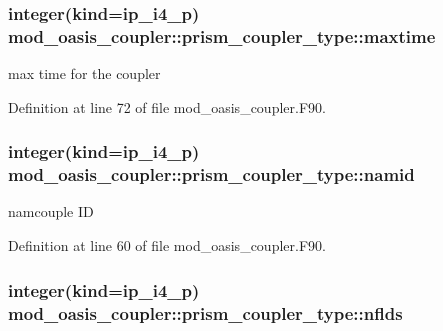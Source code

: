 \hypertarget{structmod__oasis__coupler_1_1prism__coupler__type_abe7dd91c4d011f5717e203191b7788e3}{
\subsubsection[{maxtime}]{\setlength{\rightskip}{0pt plus 5cm}integer(kind=ip\+\_\+i4\+\_\+p) mod\+\_\+oasis\+\_\+coupler\+::prism\+\_\+coupler\+\_\+type\+::maxtime\hspace{0.3cm}{\ttfamily [private]}}}\label{structmod__oasis__coupler_1_1prism__coupler__type_abe7dd91c4d011f5717e203191b7788e3}


max time for the coupler 



Definition at line 72 of file mod\+\_\+oasis\+\_\+coupler.\+F90.

\hypertarget{structmod__oasis__coupler_1_1prism__coupler__type_a68ccbd8305f8c1016a9025558ab8dea5}{
\subsubsection[{namid}]{\setlength{\rightskip}{0pt plus 5cm}integer(kind=ip\+\_\+i4\+\_\+p) mod\+\_\+oasis\+\_\+coupler\+::prism\+\_\+coupler\+\_\+type\+::namid\hspace{0.3cm}{\ttfamily [private]}}}\label{structmod__oasis__coupler_1_1prism__coupler__type_a68ccbd8305f8c1016a9025558ab8dea5}


namcouple I\+D 



Definition at line 60 of file mod\+\_\+oasis\+\_\+coupler.\+F90.

\hypertarget{structmod__oasis__coupler_1_1prism__coupler__type_a08fa25cab6817cfbc0c660a4f51d3857}{
\subsubsection[{nflds}]{\setlength{\rightskip}{0pt plus 5cm}integer(kind=ip\+\_\+i4\+\_\+p) mod\+\_\+oasis\+\_\+coupler\+::prism\+\_\+coupler\+\_\+type\+::nflds\hspace{0.3cm}{\ttfamily [private]}}}\label{structmod__oasis__coupler_1_1prism__coupler__type_a08fa25cab6817cfbc0c660a4f51d3857}


